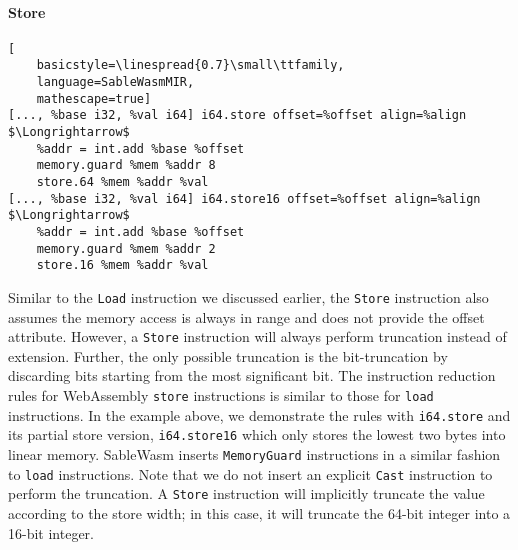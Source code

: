 \paragraph{Store} \quad
\begin{lstlisting}[
    basicstyle=\linespread{0.7}\small\ttfamily, 
    language=SableWasmMIR, 
    mathescape=true]
[..., %base i32, %val i64] i64.store offset=%offset align=%align $\Longrightarrow$
    %addr = int.add %base %offset
    memory.guard %mem %addr 8
    store.64 %mem %addr %val
[..., %base i32, %val i64] i64.store16 offset=%offset align=%align $\Longrightarrow$
    %addr = int.add %base %offset
    memory.guard %mem %addr 2
    store.16 %mem %addr %val
\end{lstlisting}
Similar to the \texttt{Load} instruction we discussed earlier, the
\texttt{Store} instruction also assumes the memory access is always in range and
does not provide the offset attribute. However, a \texttt{Store} instruction
will always perform truncation instead of extension. Further, the only possible
truncation is the bit-truncation by discarding bits starting from the most
significant bit. The instruction reduction rules for WebAssembly \texttt{store}
instructions is similar to those for \texttt{load} instructions. In the example
above, we demonstrate the rules with \texttt{i64.store} and its partial store
version, \texttt{i64.store16} which only stores the lowest two bytes into linear
memory. SableWasm inserts \texttt{MemoryGuard} instructions in a similar fashion
to \texttt{load} instructions. Note that we do not insert an explicit
\texttt{Cast} instruction to perform the truncation. A \texttt{Store}
instruction will implicitly truncate the value according to the store width; in
this case, it will truncate the 64-bit integer into a 16-bit integer.


